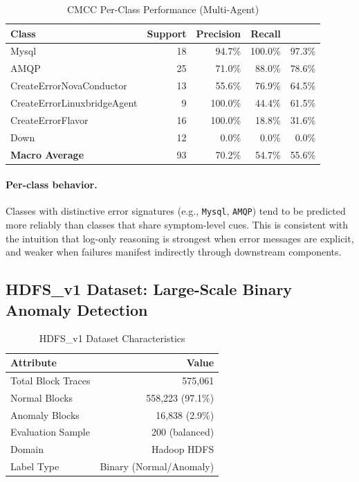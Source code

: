 \begin{table}[H]
\centering
\caption{CMCC Per-Class Performance (Multi-Agent)}
\label{tab:cmcc-perclass}
\begin{tabular}{lrrrr}
\toprule
\textbf{Class} & \textbf{Support} & \textbf{Precision} & \textbf{Recall} & \textbf{\fone{}} \\
\midrule
Mysql                       & 18 & 94.7\%  & 100.0\% & 97.3\% \\
AMQP                        & 25 & 71.0\%  & 88.0\%  & 78.6\% \\
CreateErrorNovaConductor    & 13 & 55.6\%  & 76.9\%  & 64.5\% \\
CreateErrorLinuxbridgeAgent &  9 & 100.0\% & 44.4\%  & 61.5\% \\
CreateErrorFlavor           & 16 & 100.0\% & 18.8\%  & 31.6\% \\
Down                        & 12 & 0.0\%   & 0.0\%   & 0.0\%  \\
\midrule
\textbf{Macro Average}      & 93 & 70.2\%  & 54.7\%  & 55.6\% \\
\bottomrule
\end{tabular}
\end{table}

\paragraph{Per-class behavior.}
Classes with distinctive error signatures (e.g., \texttt{Mysql}, \texttt{AMQP}) tend to be
predicted more reliably than classes that share symptom-level cues. This is consistent with the
intuition that log-only reasoning is strongest when error messages are explicit, and weaker when
failures manifest indirectly through downstream components.

\subsection{HDFS\_v1 Dataset: Large-Scale Binary Anomaly Detection}

\begin{table}[H]
\centering
\caption{HDFS\_v1 Dataset Characteristics}
\label{tab:hdfs-dataset}
\begin{tabular}{lr}
\toprule
\textbf{Attribute} & \textbf{Value} \\
\midrule
Total Block Traces & 575,061 \\
Normal Blocks      & 558,223 (97.1\%) \\
Anomaly Blocks     & 16,838  (2.9\%)  \\
Evaluation Sample  & 200 (balanced)   \\
Domain             & Hadoop HDFS      \\
Label Type         & Binary (Normal/Anomaly) \\
\bottomrule
\end{tabular}
\end{table}

